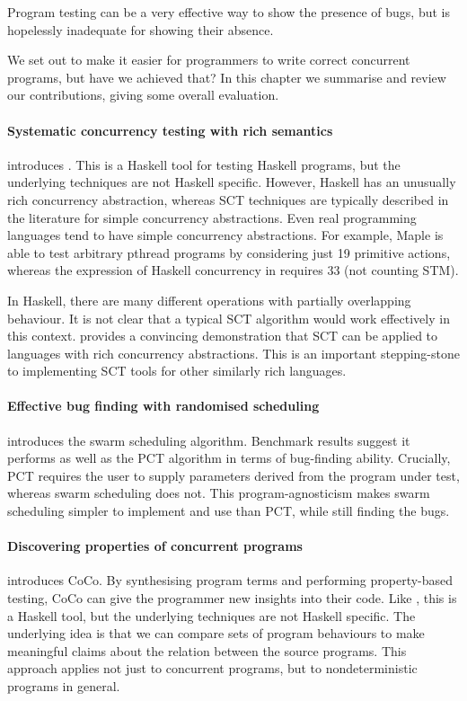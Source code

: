 \begin{displayquote}
  Program testing can be a very effective way to show the presence of
  bugs, but is hopelessly inadequate for showing their
  absence.\cite{ewd340}
\end{displayquote}

\noindent
We set out to make it easier for programmers to write correct
concurrent programs, but have we achieved that?  In this chapter we
summarise and review our contributions, giving some overall
evaluation.

\paragraph{Systematic concurrency testing with rich semantics}
 introduces \dejafu{}.  This is a Haskell tool for
testing Haskell programs, but the underlying techniques are not
Haskell specific.  However, Haskell has an unusually rich concurrency
abstraction, whereas SCT techniques are typically described in the
literature for simple concurrency abstractions.  Even real programming
languages tend to have simple concurrency abstractions.  For example,
Maple\cite{yu2012} is able to test arbitrary pthread programs by
considering just 19 primitive actions, whereas the expression of
Haskell concurrency in \dejafu{} requires 33 (not counting STM).

In Haskell, there are many different operations with partially
overlapping behaviour.  It is not clear that a typical SCT algorithm
would work effectively in this context.  \dejafu{} provides a
convincing demonstration that SCT can be applied to languages with
rich concurrency abstractions.  This is an important stepping-stone to
implementing SCT tools for other similarly rich languages.

\paragraph{Effective bug finding with randomised scheduling}
 introduces the swarm scheduling algorithm.
Benchmark results suggest it performs as well as the PCT
algorithm\cite{burckhardt2010} in terms of bug-finding ability.
Crucially, PCT requires the user to supply parameters derived from the
program under test, whereas swarm scheduling does not.  This
program-agnosticism makes swarm scheduling simpler to implement and
use than PCT, while still finding the bugs.

\paragraph{Discovering properties of concurrent programs}
 introduces CoCo.  By synthesising program terms and
performing property-based testing, CoCo can give the programmer new
insights into their code.  Like \dejafu{}, this is a Haskell tool, but
the underlying techniques are not Haskell specific.  The underlying
idea is that we can compare sets of program behaviours to make
meaningful claims about the relation between the source programs.
This approach applies not just to concurrent programs, but to
nondeterministic programs in general.

